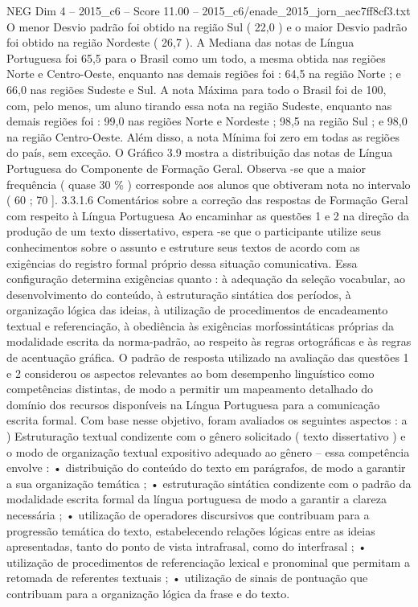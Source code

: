 \begin{textsample}{NEG Dim 4 – 2015\_c6 – Score 11.00 – 2015\_c6/enade\_2015\_jorn\_aec7ff8cf3.txt}
O menor Desvio padrão foi obtido na região Sul ( 22,0 ) e o maior Desvio padrão foi obtido na região Nordeste ( 26,7 ).
A Mediana das notas de Língua Portuguesa foi 65,5 para o Brasil como um todo, a mesma obtida nas regiões Norte e Centro-Oeste, enquanto nas demais regiões foi : 64,5 na região Norte ; e 66,0 nas regiões Sudeste e Sul.
A nota Máxima para todo o Brasil foi de 100, com, pelo menos, um aluno tirando essa nota na região Sudeste, enquanto nas demais regiões foi : 99,0 nas regiões Norte e Nordeste ; 98,5 na região Sul ; e 98,0 na região Centro-Oeste.
Além disso, a nota Mínima foi zero em todas as regiões do país, sem exceção.
O Gráfico 3.9 mostra a distribuição das notas de Língua Portuguesa do Componente de Formação Geral.
Observa -se que a maior frequência ( quase 30 \% ) corresponde aos alunos que obtiveram nota no intervalo ( 60 ; 70 ]. 3.3.1.6 Comentários sobre a correção das respostas de Formação Geral com respeito à Língua Portuguesa Ao encaminhar as questões 1 e 2 na direção da produção de um texto dissertativo, espera -se que o participante utilize seus conhecimentos sobre o assunto e estruture seus textos de acordo com as exigências do registro formal próprio dessa situação comunicativa.
Essa configuração determina exigências quanto : à adequação da seleção vocabular, ao desenvolvimento do conteúdo, à estruturação sintática dos períodos, à organização lógica das ideias, à utilização de procedimentos de encadeamento textual e referenciação, à obediência às exigências morfossintáticas próprias da modalidade escrita da norma-padrão, ao respeito às regras ortográficas e às regras de acentuação gráfica.
O padrão de resposta utilizado na avaliação das questões 1 e 2 considerou os aspectos relevantes ao bom desempenho linguístico como competências distintas, de modo a permitir um mapeamento detalhado do domínio dos recursos disponíveis na Língua Portuguesa para a comunicação escrita formal.
Com base nesse objetivo, foram avaliados os seguintes aspectos : a ) Estruturação textual condizente com o gênero solicitado ( texto dissertativo ) e o modo de organização textual expositivo adequado ao gênero – essa competência envolve : • distribuição do conteúdo do texto em parágrafos, de modo a garantir a sua organização temática ; • estruturação sintática condizente com o padrão da modalidade escrita formal da língua portuguesa de modo a garantir a clareza necessária ; • utilização de operadores discursivos que contribuam para a progressão temática do texto, estabelecendo relações lógicas entre as ideias apresentadas, tanto do ponto de vista intrafrasal, como do interfrasal ; • utilização de procedimentos de referenciação lexical e pronominal que permitam a retomada de referentes textuais ; • utilização de sinais de pontuação que contribuam para a organização lógica da frase e do texto.

\end{textsample}
